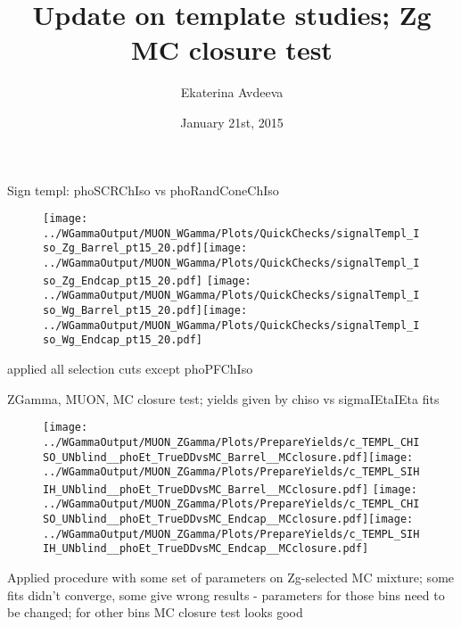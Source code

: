 \documentclass{beamer}
\title{Update on template studies; Zg MC closure test}
\author{Ekaterina Avdeeva}
\institute{University of Nebraska - Lincoln}
\date{January 21st, 2015}
\begin{document}
\begin{frame}
\titlepage
\end{frame}



\begin{frame}{Sign templ: phoSCRChIso vs phoRandConeChIso}
  \begin{figure}
    \centering
    \texttt{[image: ../WGammaOutput/MUON\_WGamma/Plots/QuickChecks/signalTempl\_Iso\_Zg\_Barrel\_pt15\_20.pdf]}\texttt{[image: ../WGammaOutput/MUON\_WGamma/Plots/QuickChecks/signalTempl\_Iso\_Zg\_Endcap\_pt15\_20.pdf]}
    \texttt{[image: ../WGammaOutput/MUON\_WGamma/Plots/QuickChecks/signalTempl\_Iso\_Wg\_Barrel\_pt15\_20.pdf]}\texttt{[image: ../WGammaOutput/MUON\_WGamma/Plots/QuickChecks/signalTempl\_Iso\_Wg\_Endcap\_pt15\_20.pdf]}
  \end{figure}
  \scriptsize applied all selection cuts except phoPFChIso
\end{frame}


\begin{frame}{ZGamma, MUON, MC closure test; yields given by chiso vs sigmaIEtaIEta fits}
  \begin{figure}
    \centering
    \texttt{[image: ../WGammaOutput/MUON\_ZGamma/Plots/PrepareYields/c\_TEMPL\_CHISO\_UNblind\_\_phoEt\_TrueDDvsMC\_Barrel\_\_MCclosure.pdf]}\texttt{[image: ../WGammaOutput/MUON\_ZGamma/Plots/PrepareYields/c\_TEMPL\_SIHIH\_UNblind\_\_phoEt\_TrueDDvsMC\_Barrel\_\_MCclosure.pdf]}
    \texttt{[image: ../WGammaOutput/MUON\_ZGamma/Plots/PrepareYields/c\_TEMPL\_CHISO\_UNblind\_\_phoEt\_TrueDDvsMC\_Endcap\_\_MCclosure.pdf]}\texttt{[image: ../WGammaOutput/MUON\_ZGamma/Plots/PrepareYields/c\_TEMPL\_SIHIH\_UNblind\_\_phoEt\_TrueDDvsMC\_Endcap\_\_MCclosure.pdf]}
  \end{figure}
  \scriptsize Applied procedure with some set of parameters on Zg-selected MC mixture; some fits didn't converge, some give wrong results - parameters for those bins need to be changed; for other bins MC closure test looks good
\end{frame}
\end{document}
